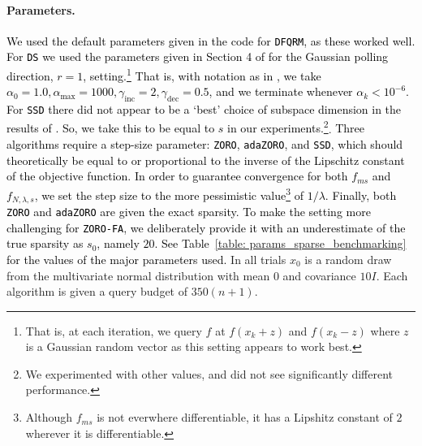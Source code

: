 
\paragraph{Parameters.} \textcolor{black}{We used the default parameters given in the code for {\tt DFQRM}, as these worked well. For {\tt DS} we used the parameters given in Section 4 of \cite{Roberts} for the Gaussian polling direction, $r=1$, setting.}\footnote{That is, at each iteration, we query $f$ at $f(x_k + z)$ and $f(x_k - z)$ where $z$ is a Gaussian random vector as this setting appears to work best.}\textcolor{black}{ That is, with notation as in \cite{Roberts}, we take $\alpha_0 = 1.0, \alpha_{\max} = 1000, \gamma_{\mathrm{inc}} = 2, \gamma_{\mathrm{dec}} = 0.5$, and we terminate whenever $\alpha_k < 10^{-6}$. For {\tt SSD} there did not appear to be a `best' choice of subspace dimension in the results of \cite{Kozak}. So, we take this to be equal to $s$ in our experiments.}\footnote{We experimented with other values, and did not see significantly different performance.}. \textcolor{black}{Three algorithms require a step-size parameter: {\tt ZORO}, {\tt adaZORO}, and {\tt SSD}, which should theoretically be equal to or proportional to the inverse of the Lipschitz constant of the objective function. In order to guarantee convergence for both $f_{ms}$ and $f_{N,\lambda, s}$, we set the step size to the more pessimistic value\footnote{Although $f_{ms}$ is not everwhere differentiable, it has a Lipshitz constant of $2$ wherever it is differentiable.} of $1/\lambda$. Finally, both {\tt ZORO} and {\tt adaZORO} are given the exact sparsity. To make the setting more challenging for {\tt ZORO-FA}, we deliberately provide it with an underestimate of the true sparsity as $s_0$, namely $20$. See Table~\ref{table: params_sparse_benchmarking} for the values of the major parameters used.} In all trials $x_0$ is a random draw from the multivariate normal distribution with mean $0$ and covariance $10I$. Each algorithm is given a query budget of $350(n+1)$.


